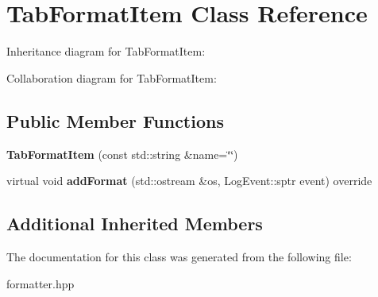 \hypertarget{classTabFormatItem}{}\section{Tab\+Format\+Item Class Reference}
\label{classTabFormatItem}


Inheritance diagram for Tab\+Format\+Item\+:


Collaboration diagram for Tab\+Format\+Item\+:
\subsection*{Public Member Functions}
\begin{DoxyCompactItemize}
\item 
\mbox{\label{classTabFormatItem_a414b7cd7c2069167d9f814a1f999b4b5}} 
{\bfseries Tab\+Format\+Item} (const std\+::string \&name=\char`\"{}\char`\"{})
\item 
\mbox{\label{classTabFormatItem_af55d552e259da059ab8d9d911b3f4906}} 
virtual void {\bfseries add\+Format} (std\+::ostream \&os, Log\+Event\+::sptr event) override
\end{DoxyCompactItemize}
\subsection*{Additional Inherited Members}


The documentation for this class was generated from the following file\+:\begin{DoxyCompactItemize}
\item 
formatter.\+hpp\end{DoxyCompactItemize}
